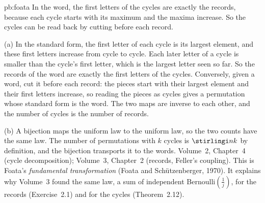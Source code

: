 \begin{solution}{pb:foata}
\idea In the word, the first letters of the cycles are exactly the records, because each cycle starts with its maximum and
the maxima increase. So the cycles can be read back by cutting before each record.

\writeup (a) In the standard form, the first letter of each cycle is its largest element, and these first letters increase from
cycle to cycle. Each later letter of a cycle is smaller than the cycle's first letter, which is the largest letter seen so far.
So the records of the word are exactly the first letters of the cycles. Conversely, given a word, cut it before each record:
the pieces start with their largest element and their first letters increase, so reading the pieces as cycles gives a
permutation whose standard form is the word. The two maps are inverse to each other, and the number of cycles is the number of
records.

(b) A bijection maps the uniform law to the uniform law, so the two counts have the same law. The number of permutations with
$k$ cycles is $\stirlingi nk$ by definition, and the bijection transports it to the words.
\tools Volume~2, Chapter~4 (cycle decomposition); Volume~3, Chapter~2 (records, Feller's coupling).
\leads This is Foata's \emph{fundamental transformation} (Foata and Schützenberger, 1970). It explains why Volume~3 found the same
law, a sum of independent Bernoulli$(\frac1j)$, for the records (Exercise~2.1) and for the cycles
(Theorem~2.12).
\end{solution}

